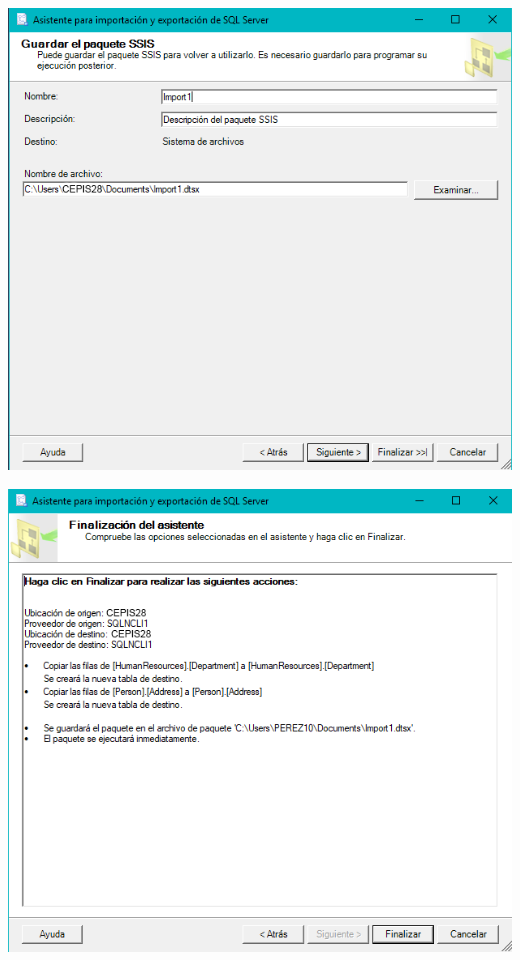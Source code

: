 	\begin{center}
	\includegraphics[width=\columnwidth]{images/task1/img9}
    \end{center}	
    
	\begin{center}
	\includegraphics[width=\columnwidth]{images/task1/img10}
    \end{center}	
    
